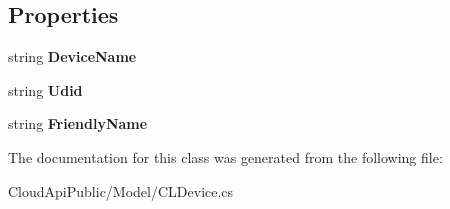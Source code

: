 \subsection*{Properties}
\begin{DoxyCompactItemize}
\item 
\hypertarget{class_cloud_api_public_1_1_model_1_1_c_l_device_ac84f552c77e11f1c836a580bbb8f71b1}{string {\bfseries Device\-Name}}\label{class_cloud_api_public_1_1_model_1_1_c_l_device_ac84f552c77e11f1c836a580bbb8f71b1}

\item 
\hypertarget{class_cloud_api_public_1_1_model_1_1_c_l_device_a2719e08142b8d907a70a74e15453e195}{string {\bfseries Udid}}\label{class_cloud_api_public_1_1_model_1_1_c_l_device_a2719e08142b8d907a70a74e15453e195}

\item 
\hypertarget{class_cloud_api_public_1_1_model_1_1_c_l_device_af332e2bb500ed89cc6ceb0dd8b30dbf4}{string {\bfseries Friendly\-Name}}\label{class_cloud_api_public_1_1_model_1_1_c_l_device_af332e2bb500ed89cc6ceb0dd8b30dbf4}

\end{DoxyCompactItemize}


The documentation for this class was generated from the following file\-:\begin{DoxyCompactItemize}
\item 
Cloud\-Api\-Public/\-Model/C\-L\-Device.\-cs\end{DoxyCompactItemize}
